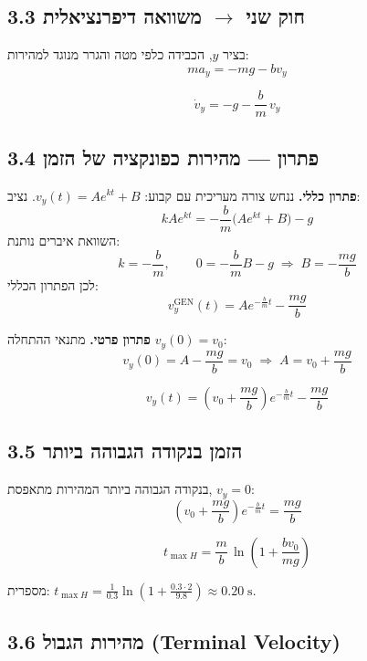 \documentclass[12pt, a4paper]{article}
\begin{document}
\subsection*{3.3 חוק שני $\to$ משוואה דיפרנציאלית}

בציר \textenglish{$y$}, הכבידה כלפי מטה והגרר מנוגד למהירות:
\[
  m a_y = -mg - b v_y
\]

\begin{tcolorbox}[resultbox]
\[
  \dot{v}_y = -g - \frac{b}{m}\,v_y
\]
\end{tcolorbox}

\subsection*{3.4 פתרון --- מהירות כפונקציה של הזמן}

\textbf{פתרון כללי.} ננחש צורה מעריכית עם קבוע: \textenglish{$v_y(t) = A e^{kt} + B$}. נציב:
\[
  kA e^{kt} = -\frac{b}{m}\bigl(A e^{kt} + B\bigr) - g
\]
השוואת איברים נותנת:
\[
  k = -\frac{b}{m},
  \qquad
  0 = -\frac{b}{m}B - g
  \;\Longrightarrow\;
  B = -\frac{mg}{b}
\]
לכן הפתרון הכללי:
\[
  v_y^{\text{GEN}}(t) = A e^{-\frac{b}{m}t} - \frac{mg}{b}
\]

\textbf{פתרון פרטי.} מתנאי ההתחלה \textenglish{$v_y(0) = v_0$}:
\[
  v_y(0) = A - \frac{mg}{b} = v_0
  \;\Longrightarrow\;
  A = v_0 + \frac{mg}{b}
\]

\begin{tcolorbox}[resultbox, title={מהירות אנכית תחת כבידה וגרר}]
\[
  v_y(t) = \left(v_0 + \frac{mg}{b}\right) e^{-\frac{b}{m}t} - \frac{mg}{b}
\]
\end{tcolorbox}

\subsection*{3.5 הזמן בנקודה הגבוהה ביותר}

בנקודה הגבוהה ביותר המהירות מתאפסת, \textenglish{$v_y = 0$}:
\[
  \left(v_0 + \frac{mg}{b}\right) e^{-\frac{b}{m}t} = \frac{mg}{b}
\]

\begin{tcolorbox}[resultbox]
\[
  t_{\max H} = \frac{m}{b}\,\ln\!\left(1 + \frac{b v_0}{mg}\right)
\]
\end{tcolorbox}

מספרית: \textenglish{$t_{\max H} = \tfrac{1}{0.3}\ln\!\left(1 + \tfrac{0.3\cdot 2}{9.8}\right) \approx 0.20\;\text{s}$}.

\subsection*{3.6 מהירות הגבול (\textenglish{Terminal Velocity})}
\end{document}
